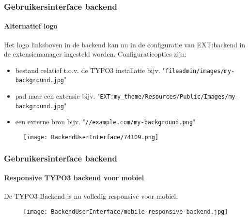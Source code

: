 \begin{frame}[fragile]
	\frametitle{Gebruikersinterface backend}
	\framesubtitle{Alternatief logo}

	Het logo linksboven in de backend kan nu in de configuratie van EXT:backend in de extensiemanager
	ingesteld worden.\newline
	Configuratieopties zijn:

	\begin{itemize}
		\item bestand relatief t.o.v. de TYPO3 installatie\newline
			\smaller
				bijv. "\texttt{fileadmin/images/my-background.jpg}"
			\normalsize

		\item pad naar een extensie\newline
			\smaller
				bijv. "\texttt{EXT:my\_theme/Resources/Public/Images/my-background.jpg}"
			\normalsize

		\item een externe bron\newline
			\smaller
				bijv. "\texttt{//example.com/my-background.png}"
			\normalsize

	\end{itemize}

	\begin{figure}
		\texttt{[image: BackendUserInterface/74109.png]}
	\end{figure}

\end{frame}


\begin{frame}[fragile]
	\frametitle{Gebruikersinterface backend}
	\framesubtitle{Responsive TYPO3 backend voor mobiel}

	De TYPO3 Backend is nu volledig responsive voor mobiel.

	\begin{figure}
		\texttt{[image: BackendUserInterface/mobile-responsive-backend.jpg]}
	\end{figure}

\end{frame}

